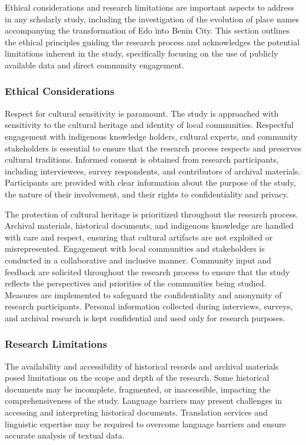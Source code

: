 Ethical considerations and research limitations are important aspects to address in any scholarly study, including the investigation of the evolution of place names accompanying the transformation of Edo into Benin City. This section outlines the ethical principles guiding the research process and acknowledges the potential limitations inherent in the study, specifically focusing on the use of publicly available data and direct community engagement.

\subsubsection{Ethical Considerations}

Respect for cultural sensitivity is paramount. The study is approached with sensitivity to the cultural heritage and identity of local communities. Respectful engagement with indigenous knowledge holders, cultural experts, and community stakeholders is essential to ensure that the research process respects and preserves cultural traditions. Informed consent is obtained from research participants, including interviewees, survey respondents, and contributors of archival materials. Participants are provided with clear information about the purpose of the study, the nature of their involvement, and their rights to confidentiality and privacy.

The protection of cultural heritage is prioritized throughout the research process. Archival materials, historical documents, and indigenous knowledge are handled with care and respect, ensuring that cultural artifacts are not exploited or misrepresented. Engagement with local communities and stakeholders is conducted in a collaborative and inclusive manner. Community input and feedback are solicited throughout the research process to ensure that the study reflects the perspectives and priorities of the communities being studied. Measures are implemented to safeguard the confidentiality and anonymity of research participants. Personal information collected during interviews, surveys, and archival research is kept confidential and used only for research purposes.

\subsubsection{Research Limitations}

The availability and accessibility of historical records and archival materials posed limitations on the scope and depth of the research. Some historical documents may be incomplete, fragmented, or inaccessible, impacting the comprehensiveness of the study. Language barriers may present challenges in accessing and interpreting historical documents. Translation services and linguistic expertise may be required to overcome language barriers and ensure accurate analysis of textual data.

